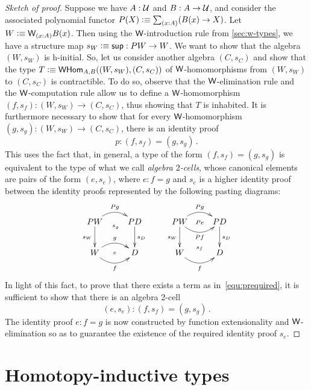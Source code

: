 \begin{proof}[Sketch of proof]
Suppose we have $A : \mathcal{U}$ and $B : A \to \mathcal{U}$,
and consider the associated polynomial functor $P(X)\defeq\sm{x:A}(B(x)\to X)$.
Let $W \defeq \wtype{x:A}B(x)$.  Then using
the $\mathsf{W}$-introduction rule from \autoref{sec:w-types}, we have a structure map $s_W\vcentcolon\equiv{\mathsf{sup}}: PW \rightarrow W$. 
We want to show that the algebra $(W, s_W)$ is
h-initial. So, let us consider another algebra $(C,s_C)$ and show that the type $T\vcentcolon\equiv \mathsf{\mathsf{W} Hom}_{A,B}((W, s_W),(C,s_C)) $ 
of  $\mathsf{W}$-homomorphisms from $(W, s_W)$ to $(C, s_C)$ is contractible. To do
so, observe that the $\mathsf{W}$-elimination rule and the $\mathsf{W}$-computation
rule allow us to define a $\mathsf{W}$-homomorphism $(f, s_f) : (W, s_W) \rightarrow (C, s_C)$, 
thus showing that $T$ is inhabited. It is furthermore necessary to show that for every $\mathsf{W}$-homomorphism $(g, s_g) : (W, s_W) \rightarrow (C, s_C)$, there is an identity proof 
\begin{equation}
\label{equ:prequired}
p :  (f,s_f) = (g,s_g)  \, .
\end{equation}
This uses the fact that, in general, a type of the form $(f,s_f) = (g,s_g) $
is  equivalent to the type of what we call \emph{algebra $2$-cells}, whose canonical
elements are pairs of the form $(e, s_e)$, where $e : f=g$ and $s_e$ is a higher identity proof between the identity proofs represented by the following pasting diagrams:
\[
\xymatrix{
PW \ar@/^1pc/[r]^{Pg}   \ar[d]_{s_W} \ar@{}[r]_(.52){s_g}  & PD \ar[d]^{s_D}  \\
W \ar@/^1pc/[r]^g  \ar@/_1pc/[r]_f  \ar@{}[r]|{e} & D } \qquad
\xymatrix{
PW \ar@/^1pc/[r]^{Pg}   \ar[d]_{s_W}   \ar@/_1pc/[r]_{Pf} \ar@{}[r]|{Pe}
& PD \ar[d]^{s_D}  \\
W  \ar@/_1pc/[r]_f  \ar@{}[r]^{s_f} & D }
\]
In light of this fact, to prove that there exists a term as in~\eqref{equ:prequired}, it is 
sufficient to show that there is an algebra 2-cell 
\[
(e,s_e) : (f,s_f) = (g,s_g) \, .
\]
The identity proof $e : f=g$ is now constructed by function extensionality and
$\mathsf{W}$-elimination so as to guarantee the existence of the required identity
proof $s_e$. 
\end{proof}



\section{Homotopy-inductive types}
\label{sec:htpy-inductive}

